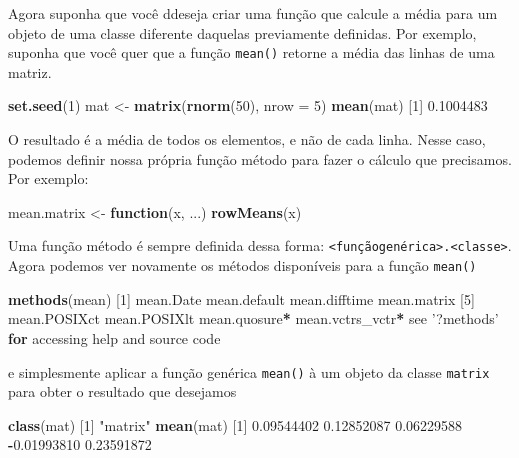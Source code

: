 \documentclass[10pt,a4paper]{book}
\newenvironment{Shaded}{\begin{snugshade}}{\end{snugshade}}
\newcommand{\KeywordTok}[1]{\textcolor[rgb]{0.13,0.29,0.53}{\textbf{#1}}}
\newcommand{\DataTypeTok}[1]{\textcolor[rgb]{0.13,0.29,0.53}{#1}}
\newcommand{\DecValTok}[1]{\textcolor[rgb]{0.00,0.00,0.81}{#1}}
\newcommand{\FloatTok}[1]{\textcolor[rgb]{0.00,0.00,0.81}{#1}}
\newcommand{\StringTok}[1]{\textcolor[rgb]{0.31,0.60,0.02}{#1}}
\newcommand{\ControlFlowTok}[1]{\textcolor[rgb]{0.13,0.29,0.53}{\textbf{#1}}}
\newcommand{\OperatorTok}[1]{\textcolor[rgb]{0.81,0.36,0.00}{\textbf{#1}}}
\newcommand{\NormalTok}[1]{#1}
\begin{document}
Agora suponha que você ddeseja criar uma função que calcule a média para
um objeto de uma classe diferente daquelas previamente definidas. Por
exemplo, suponha que você quer que a função \texttt{mean()} retorne a
média das linhas de uma matriz.

\begin{Shaded}
\begin{Highlighting}[]
\KeywordTok{set.seed}\NormalTok{(}\DecValTok{1}\NormalTok{)}
\NormalTok{mat <-}\StringTok{ }\KeywordTok{matrix}\NormalTok{(}\KeywordTok{rnorm}\NormalTok{(}\DecValTok{50}\NormalTok{), }\DataTypeTok{nrow =} \DecValTok{5}\NormalTok{)}
\KeywordTok{mean}\NormalTok{(mat)}
\NormalTok{[}\DecValTok{1}\NormalTok{] }\FloatTok{0.1004483}
\end{Highlighting}
\end{Shaded}

O resultado é a média de todos os elementos, e não de cada linha. Nesse
caso, podemos definir nossa própria função método para fazer o cálculo
que precisamos. Por exemplo:

\begin{Shaded}
\begin{Highlighting}[]
\NormalTok{mean.matrix <-}\StringTok{ }\ControlFlowTok{function}\NormalTok{(x, ...) }\KeywordTok{rowMeans}\NormalTok{(x)}
\end{Highlighting}
\end{Shaded}

Uma função método é sempre definida dessa forma:
\texttt{\textless{}funçãogenérica\textgreater{}.\textless{}classe\textgreater{}}.
Agora podemos ver novamente os métodos disponíveis para a função
\texttt{mean()}

\begin{Shaded}
\begin{Highlighting}[]
\KeywordTok{methods}\NormalTok{(mean)}
\NormalTok{[}\DecValTok{1}\NormalTok{] mean.Date        mean.default     mean.difftime    mean.matrix     }
\NormalTok{[}\DecValTok{5}\NormalTok{] mean.POSIXct     mean.POSIXlt     mean.quosure}\OperatorTok{*}\StringTok{    }\NormalTok{mean.vctrs_vctr}\OperatorTok{*}
\NormalTok{see }\StringTok{'?methods'} \ControlFlowTok{for}\NormalTok{ accessing help and source code}
\end{Highlighting}
\end{Shaded}

e simplesmente aplicar a função genérica \texttt{mean()} à um objeto da
classe \texttt{matrix} para obter o resultado que desejamos

\begin{Shaded}
\begin{Highlighting}[]
\KeywordTok{class}\NormalTok{(mat)}
\NormalTok{[}\DecValTok{1}\NormalTok{] }\StringTok{"matrix"}
\KeywordTok{mean}\NormalTok{(mat)}
\NormalTok{[}\DecValTok{1}\NormalTok{]  }\FloatTok{0.09544402}  \FloatTok{0.12852087}  \FloatTok{0.06229588} \OperatorTok{-}\FloatTok{0.01993810}  \FloatTok{0.23591872}
\end{Highlighting}
\end{Shaded}
\end{document}
